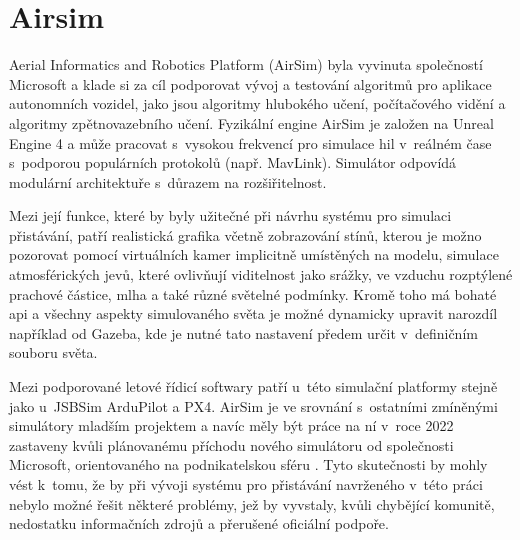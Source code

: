     \section{Airsim} \label{sec:airsim}
        Aerial Informatics and Robotics Platform (AirSim) byla vyvinuta společností Microsoft a klade si za cíl podporovat vývoj a testování algoritmů pro aplikace autonomních vozidel, jako jsou algoritmy hlubokého učení, počítačového vidění a algoritmy zpětnovazebního učení. Fyzikální engine AirSim je založen na Unreal Engine 4 a může pracovat s~vysokou frekvencí pro simulace \acrshort{hil} v~reálném čase s~podporou populárních protokolů (např. MavLink). Simulátor odpovídá modulární architektuře s~důrazem na rozšiřitelnost. \cite{Ebeid2018}

        Mezi její funkce, které by byly užitečné při návrhu systému pro simulaci přistávání, patří realistická grafika včetně zobrazování stínů, kterou je možno pozorovat pomocí virtuálních kamer implicitně umístěných na modelu, simulace atmosférických jevů, které ovlivňují viditelnost jako srážky, ve vzduchu rozptýlené prachové částice, mlha a také různé světelné podmínky. Kromě toho má bohaté \acrshort{api} a všechny aspekty simulovaného světa je možné dynamicky upravit narozdíl například od Gazeba, kde je nutné tato nastavení předem určit v~definičním souboru světa. \cite{airsim}

        Mezi podporované letové řídicí softwary patří u~této simulační platformy stejně jako u~JSBSim ArduPilot a PX4. AirSim je ve srovnání s~ostatními zmíněnými simulátory mladším projektem a navíc měly být práce na ní v~roce 2022 zastaveny kvůli plánovanému příchodu nového simulátoru od společnosti Microsoft, orientovaného na podnikatelskou sféru \cite{airsimweb}. Tyto skutečnosti by mohly vést k~tomu, že by při vývoji systému pro přistávání navrženého v~této práci nebylo možné řešit některé problémy, jež by vyvstaly, kvůli chybějící komunitě, nedostatku informačních zdrojů a přerušené oficiální podpoře.